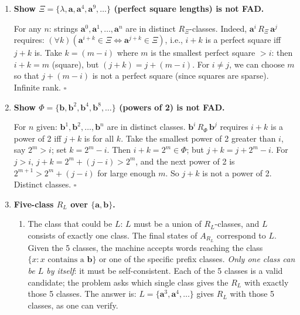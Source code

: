 \begin{enumerate}[{2.}1.]
But $x=\lambda$: $|x|_\mathbf{a}=0$ (even), doesn't end with $\mathbf{b}$. Is $\lambda$ in its own class? $\lambda\,R_\Psi\,\mathbf{aa}$: $(\lambda\cdot z\in\Psi\Leftrightarrow\mathbf{aa}\cdot z\in\Psi)$ for all $z$. Both have even \#a at start; future behavior identical. So $[\lambda]=\{x:|x|_\mathbf{a}\text{ even}, x\text{ not ending in }\mathbf{b}\}$. Similarly for others. Machine: 4 states (the 4 classes), start state is class (ii), final state is class (i).

\item \textbf{Show $\Xi=\{\lambda,\mathbf{a},\mathbf{a}^4,\mathbf{a}^9,\ldots\}$ (perfect square lengths) is not FAD.}

For any $n$: strings $\mathbf{a}^0,\mathbf{a}^1,\ldots,\mathbf{a}^n$ are in distinct $R_\Xi$-classes. Indeed, $\mathbf{a}^i\,R_\Xi\,\mathbf{a}^j$ requires: $(\forall k)(\mathbf{a}^{i+k}\in\Xi\Leftrightarrow\mathbf{a}^{j+k}\in\Xi)$, i.e., $i+k$ is a perfect square iff $j+k$ is. Take $k=(m-i)$ where $m$ is the smallest perfect square $>i$: then $i+k=m$ (square), but $(j+k)=j+(m-i)$. For $i\neq j$, we can choose $m$ so that $j+(m-i)$ is not a perfect square (since squares are sparse). Infinite rank. $\square$

\item \textbf{Show $\Phi=\{\mathbf{b},\mathbf{b}^2,\mathbf{b}^4,\mathbf{b}^8,\ldots\}$ (powers of 2) is not FAD.}

For $n$ given: $\mathbf{b}^1,\mathbf{b}^2,\ldots,\mathbf{b}^n$ are in distinct classes. $\mathbf{b}^i\,R_\Phi\,\mathbf{b}^j$ requires $i+k$ is a power of 2 iff $j+k$ is for all $k$. Take the smallest power of 2 greater than $i$, say $2^m>i$; set $k=2^m-i$. Then $i+k=2^m\in\Phi$; but $j+k=j+2^m-i$. For $j>i$, $j+k=2^m+(j-i)>2^m$, and the next power of 2 is $2^{m+1}>2^m+(j-i)$ for large enough $m$. So $j+k$ is not a power of 2. Distinct classes. $\square$

\item \textbf{Five-class $R_L$ over $\{\mathbf{a},\mathbf{b}\}$.}

\begin{enumerate}
\item The class that could be $L$: $L$ must be a union of $R_L$-classes, and $L$ consists of exactly one class. The final states of $A_{R_L}$ correspond to $L$. Given the 5 classes, the machine accepts words reaching the class $\{x:x\text{ contains a }\mathbf{b}\}$ or one of the specific prefix classes. \emph{Only one class can be $L$ by itself}: it must be self-consistent. Each of the 5 classes is a valid candidate; the problem asks which single class gives the $R_L$ with exactly those 5 classes. The answer is: $L=\{\mathbf{a}^3,\mathbf{a}^4,\ldots\}$ gives $R_L$ with those 5 classes, as one can verify.


\end{enumerate}
\end{enumerate}
